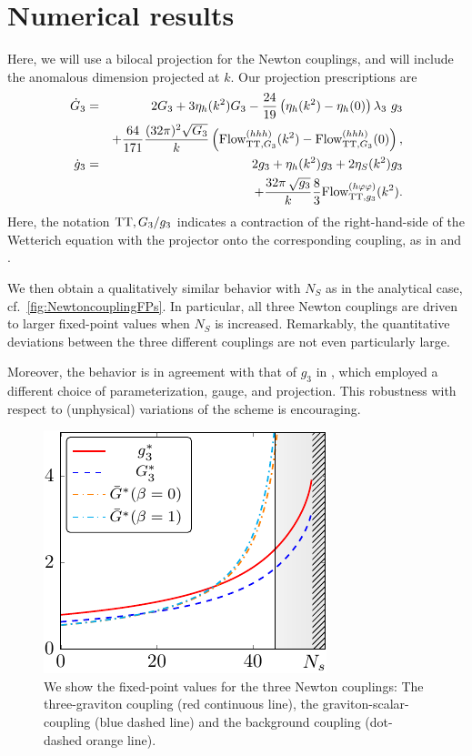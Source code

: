 \documentclass[11pt]{book} %
\newcommand{\bea}{\begin{eqnarray}}
\newcommand{\eea}{\end{eqnarray}}
\begin{document}
\section{Numerical results}
Here, we will use a bilocal projection for the Newton couplings, and will include the anomalous dimension projected at $k$.
Our projection prescriptions are
%
\bea
\dot G_3 &=& 2G_3 + 3 \eta_h(k^2) G_3 -\frac{24}{19}\left(\eta_h(k^2)
    -\eta_h(0)\right)\lambda_3\ g_3 \\
     &{}&+ \frac{64}{171}
  \frac{(32\pi)^2\sqrt{G_3}}{k}\left(\text{Flow}^{(hhh)}_{{\rm TT},G_3}(k^2)-
    \text{Flow}^{(hhh)}_{{\rm TT},G_3}(0)\right),\nonumber\\
    \dot g_3 &=& 2 g_3 + \eta_h(k^2)g_3 +2 \eta_S(k^2)g_3\\
    &{}&+ \frac{32 \pi\, \sqrt{g_3}}{k}\frac{8}{3}\text{Flow}^{(h\varphi\varphi)}_{{\rm TT},g_3}(k^2).\nonumber
\eea
%
Here, the notation ${\rm TT}, G_3/g_3$ indicates a contraction of the right-hand-side of the Wetterich equation with the projector onto the corresponding coupling, as in \cite{Meibohm:2015twa} and \cite{Dona:2013qba}.

We then obtain a qualitatively similar behavior with $N_S$ as in the analytical case, cf.~\autoref{fig:NewtoncouplingFPs}. 
In particular, all three Newton couplings are driven to larger fixed-point values when $N_S$ is increased. 
Remarkably, the quantitative deviations between the three different couplings are not even particularly large.

Moreover, the behavior is in agreement with that of $g_3$ in \cite{Dona:2015tnf}, which employed a different choice of parameterization, gauge, and projection. 
This robustness with respect to (unphysical) variations of the scheme is encouraging.

%
\begin{figure}[b!]
\includegraphics[width=\linewidth]{NS_findiff_all_hss_all_g-crop.pdf}
\caption{We show the fixed-point values for the three Newton couplings: 
	The three-graviton coupling (red continuous line), the graviton-scalar-coupling (blue dashed line) and the background coupling (dot-dashed orange line).}
\label{fig:NewtoncouplingFPs}
\end{figure}
%
\end{document}

